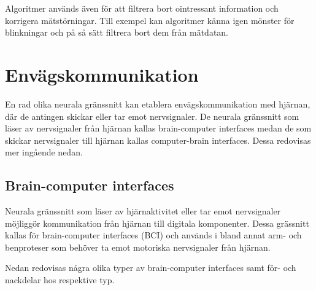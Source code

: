 \documentclass[12pt, a4paper]{article}
\begin{document}



Algoritmer används även för att filtrera bort ointressant information och
korrigera mätstörningar. Till exempel kan algoritmer känna igen mönster för
blinkningar och på så sätt filtrera bort dem från mätdatan.


\section{Envägskommunikation}

En rad olika neurala gränssnitt kan etablera envägskommunikation med hjärnan,
där de antingen skickar eller tar emot nervsignaler. De neurala gränssnitt som
läser av nervsignaler från hjärnan kallas brain-computer interfaces medan de som
skickar nervsignaler till hjärnan kallas computer-brain interfaces. Dessa
redovisas mer ingående nedan.



\subsection{Brain-computer interfaces}

Neurala gränssnitt som läser av hjärnaktivitet eller tar emot nervsignaler
möjliggör kommunikation från hjärnan till digitala komponenter. Dessa grässnitt
kallas för brain-computer interfaces (BCI) och används i bland annat arm- och
benproteser som behöver ta emot motoriska nervsignaler från hjärnan.

Nedan redovisas några olika typer av brain-computer interfaces samt för- och
nackdelar hos respektive typ.
\end{document}

